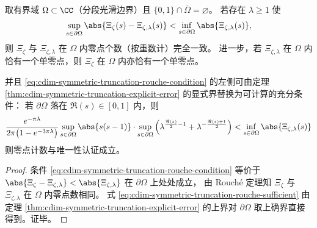 \begin{theorem}\label{thm:cdim-symmetric-truncation-rouche-zero-count}
取有界域 \(\Omega\subset\CC\)（分段光滑边界）且 \(\{0,1\}\cap\overline{\Omega}=\varnothing\)。
若存在 \(\lambda\ge 1\) 使
\begin{equation}\label{eq:cdim-symmetric-truncation-rouche-condition}
\sup_{s\in\partial\Omega}\abs{\Xi_\zeta(s)-\Xi_{\zeta,\lambda}(s)}
<
\inf_{s\in\partial\Omega}\abs{\Xi_{\zeta,\lambda}(s)},
\end{equation}
则 \(\Xi_\zeta\) 与 \(\Xi_{\zeta,\lambda}\) 在 \(\Omega\) 内零点个数（按重数计）完全一致。
进一步，若 \(\Xi_{\zeta,\lambda}\) 在 \(\Omega\) 内恰有一个单零点，则 \(\Xi_\zeta\) 在 \(\Omega\) 内亦恰有一个单零点。
\par
并且 \eqref{eq:cdim-symmetric-truncation-rouche-condition} 的左侧可由定理 \ref{thm:cdim-symmetric-truncation-explicit-error} 的显式界替换为可计算的充分条件：
若 \(\partial\Omega\) 落在 \(\Re(s)\in[0,1]\) 内，则
\begin{equation}\label{eq:cdim-symmetric-truncation-rouche-sufficient}
\frac{e^{-\pi\lambda}}{2\pi\bigl(1-e^{-3\pi\lambda}\bigr)}
\sup_{s\in\partial\Omega}\abs{s(s-1)}
\cdot
\sup_{s\in\partial\Omega}
\left(\lambda^{\frac{\Re(s)}{2}-1}+\lambda^{-\frac{\Re(s)+1}{2}}\right)
<
\inf_{s\in\partial\Omega}\abs{\Xi_{\zeta,\lambda}(s)}
\end{equation}
则零点计数与唯一性认证成立。
\end{theorem}
\begin{proof}
条件 \eqref{eq:cdim-symmetric-truncation-rouche-condition} 等价于 \(\abs{\Xi_\zeta-\Xi_{\zeta,\lambda}}<\abs{\Xi_{\zeta,\lambda}}\) 在 \(\partial\Omega\) 上处处成立，
由 Rouch\'e 定理知 \(\Xi_\zeta\) 与 \(\Xi_{\zeta,\lambda}\) 在 \(\Omega\) 内零点数相同。
式 \eqref{eq:cdim-symmetric-truncation-rouche-sufficient} 由定理 \ref{thm:cdim-symmetric-truncation-explicit-error} 的上界对 \(\partial\Omega\) 取上确界直接得到。证毕。
\end{proof}

